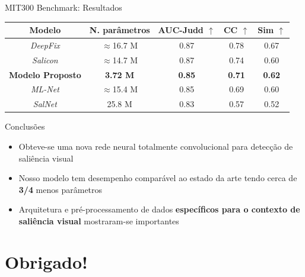 \documentclass[10pt]{beamer}
\newcommand{\tbf}[1]{\textbf{#1}}
\begin{document}
\begin{frame}{MIT300 Benchmark: Resultados}
\begin{table}[!htb]
	\small
    \centering
    \label{table:results}
    \begin{tabular}{|c|c|c|c|c|}
        \hline
        Modelo & N. parâmetros & AUC-Judd $\uparrow$ & CC $\uparrow$
            & Sim $\uparrow$\\
        \hline
        \emph{DeepFix} & $\approx$16.7 M & 0.87 & 0.78
            & 0.67\\
        \hline
        \emph{Salicon} & $\approx$14.7 M & 0.87 & 0.74
            & 0.60\\
        \hline
        \textbf{Modelo Proposto} & \textbf{3.72 M} & \textbf{0.85} &
        \textbf{0.71} & \textbf{0.62}\\
        \hline
        \emph{ML-Net} & $\approx$15.4 M & 0.85 & 0.69 & 0.60\\
        \hline
        \emph{SalNet} & 25.8 M & 0.83 & 0.57 & 0.52\\
        \hline
    \end{tabular}
\end{table}
\end{frame}

\begin{frame}{Conclusões}
    \begin{itemize}[<+->]
        \item Obteve-se uma nova rede neural totalmente convolucional
            para detecção de saliência visual
        \item Nosso modelo tem desempenho comparável ao estado da arte
            tendo cerca de \tbf{3/4} menos parâmetros
        \item Arquitetura e pré-processamento de dados \tbf{específicos
            para o contexto de saliência visual} mostraram-se importantes
    \end{itemize}
\end{frame}

\section{Obrigado!}
\end{document}
